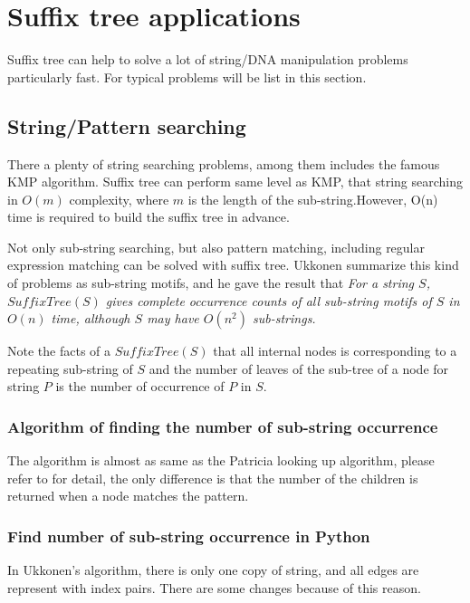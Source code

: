 \documentclass{article}
\begin{document}
\section{Suffix tree applications}

Suffix tree can help to solve a lot of string/DNA manipulation problems
particularly fast. For typical problems will be list in this section.

\subsection{String/Pattern searching}
\label{substring-lookup}

There a plenty of string searching problems, among them includes the
famous KMP algorithm. Suffix tree can perform same level as 
KMP\cite{zhang-shaojie-lec}, that string searching in $O(m)$ complexity, 
where $m$ is the length of the sub-string.However, O(n) time is 
required to build the suffix tree in advance\cite{lallison-stree}.

Not only sub-string searching, but also pattern matching, including
regular expression matching can be solved with suffix tree. Ukkonen
summarize this kind of problems as sub-string motifs, and he gave the
result that {\em For a string $S$, $SuffixTree(S)$ gives complete occurrence 
counts of all sub-string motifs of $S$ in $O(n)$ time, although $S$ may have
$O(n^2)$ sub-strings.}

Note the facts of a $SuffixTree(S)$ that all internal nodes is corresponding
to a repeating sub-string of $S$ and the number of leaves of the sub-tree of a
node for string $P$ is the number of occurrence of $P$ in $S$.\cite{ukkonen-lec}

\subsubsection{Algorithm of finding the number of sub-string occurrence}
The algorithm is almost as same as the Patricia looking up algorithm, 
please refer to \cite{lxy-trie} for detail, the only difference is that
the number of the children is returned when a node matches the pattern.

\subsubsection*{Find number of sub-string occurrence in Python}

In Ukkonen's algorithm, there is only one copy
of string, and all edges are represent with index pairs. There are
some changes because of this reason. 
\end{document}
